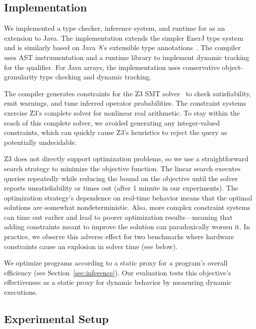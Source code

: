 \documentclass[10pt,nocopyrightspace,preprint]{sigplanconf}
\begin{document}
\subsection{Implementation}

We implemented a type checker, inference system, and runtime for \lang as an
extension to Java.
The implementation extends the simpler EnerJ type system~\cite{enerj} and is
similarly based on Java~8's extensible type annotations~\cite{jsr308}.
The compiler uses AST instrumentation and a runtime library to implement
dynamic tracking for the \Dyn qualifier.
For Java arrays, the implementation uses conservative object-granularity type
checking and dynamic tracking.

The compiler generates constraints for the Z3 SMT solver~\cite{z3} to check
satisfiability, emit warnings, and tune inferred operator probabilities.
The constraint systems exercise Z3's complete
solver for nonlinear real arithmetic.
To stay within the reach of this complete solver, we avoided generating any
integer-valued constraints, which can quickly cause Z3's heuristics to reject
the query as potentially undecidable.

Z3 does not directly support optimization problems, so
we use a straightforward search strategy to
minimize the objective function.
The linear search executes queries repeatedly while reducing the bound on the
objective until the solver reports unsatisfiability or times out (after 1
minute in our experiments).
The optimization strategy's dependence on real-time behavior means that the
optimal solutions are somewhat nondeterministic.
Also, more complex constraint systems can time out earlier and lead to
poorer optimization results---meaning that adding constraints meant
to improve the solution can paradoxically worsen it.
In practice, we observe this adverse effect for two benchmarks where hardware
constraints cause an explosion in solver time (see below).

We optimize programs according to a static proxy for a program's overall
efficiency (see Section~\ref{sec:inference}).
Our evaluation tests this objective's effectiveness as a static proxy for
dynamic behavior by measuring dynamic executions.

\subsection{Experimental Setup}
\end{document}

